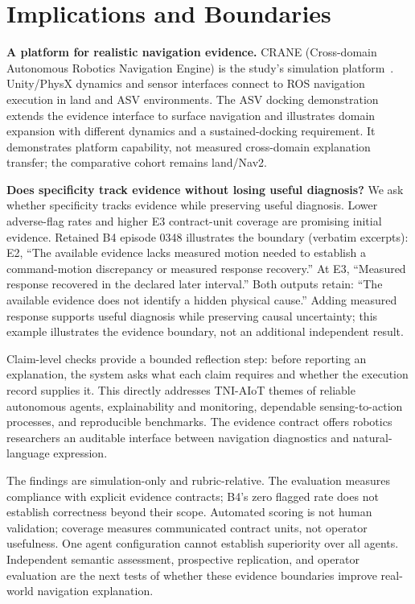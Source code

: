 \documentclass[conference]{IEEEtran}
\begin{document}
\section{Implications and Boundaries}
\textbf{A platform for realistic navigation evidence.} CRANE (Cross-domain Autonomous Robotics Navigation Engine) is the study's simulation platform~\cite{crane}. Unity/PhysX dynamics and sensor interfaces connect to ROS navigation execution in land and ASV environments. The ASV docking demonstration extends the evidence interface to surface navigation and illustrates domain expansion with different dynamics and a sustained-docking requirement. It demonstrates platform capability, not measured cross-domain explanation transfer; the comparative cohort remains land/Nav2.

\textbf{Does specificity track evidence without losing useful diagnosis?} We ask whether specificity tracks evidence while preserving useful diagnosis. Lower adverse-flag rates and higher E3 contract-unit coverage are promising initial evidence. Retained B4 episode 0348 illustrates the boundary (verbatim excerpts): E2, ``The available evidence lacks measured motion needed to establish a command-motion discrepancy or measured response recovery.'' At E3, ``Measured response recovered in the declared later interval.'' Both outputs retain: ``The available evidence does not identify a hidden physical cause.'' Adding measured response supports useful diagnosis while preserving causal uncertainty; this example illustrates the evidence boundary, not an additional independent result.

Claim-level checks provide a bounded reflection step: before reporting an explanation, the system asks what each claim requires and whether the execution record supplies it. This directly addresses TNI-AIoT themes of reliable autonomous agents, explainability and monitoring, dependable sensing-to-action processes, and reproducible benchmarks. The evidence contract offers robotics researchers an auditable interface between navigation diagnostics and natural-language expression.

The findings are simulation-only and rubric-relative. The evaluation measures compliance with explicit evidence contracts; B4's zero flagged rate does not establish correctness beyond their scope. Automated scoring is not human validation; coverage measures communicated contract units, not operator usefulness. One agent configuration cannot establish superiority over all agents. Independent semantic assessment, prospective replication, and operator evaluation are the next tests of whether these evidence boundaries improve real-world navigation explanation.
\end{document}
